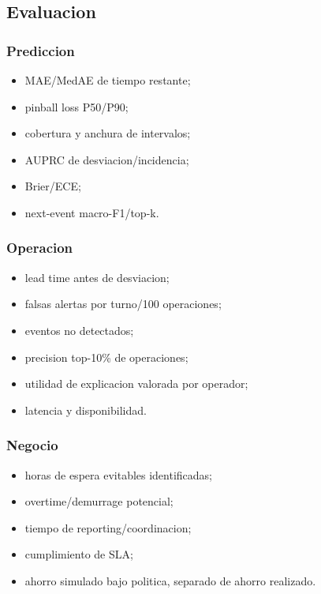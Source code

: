 \documentclass[
  spanish,
  10pt,
  a4paper,
]{article}
\providecommand{\tightlist}{%
  \setlength{\itemsep}{0pt}\setlength{\parskip}{0pt}}
\begin{document}
\subsection{Evaluacion}\label{evaluacion}

\subsubsection{Prediccion}\label{prediccion}

\begin{itemize}
\tightlist
\item
  MAE/MedAE de tiempo restante;
\item
  pinball loss P50/P90;
\item
  cobertura y anchura de intervalos;
\item
  AUPRC de desviacion/incidencia;
\item
  Brier/ECE;
\item
  next-event macro-F1/top-k.
\end{itemize}

\subsubsection{Operacion}\label{operacion}

\begin{itemize}
\tightlist
\item
  lead time antes de desviacion;
\item
  falsas alertas por turno/100 operaciones;
\item
  eventos no detectados;
\item
  precision top-10\% de operaciones;
\item
  utilidad de explicacion valorada por operador;
\item
  latencia y disponibilidad.
\end{itemize}

\subsubsection{Negocio}\label{negocio}

\begin{itemize}
\tightlist
\item
  horas de espera evitables identificadas;
\item
  overtime/demurrage potencial;
\item
  tiempo de reporting/coordinacion;
\item
  cumplimiento de SLA;
\item
  ahorro simulado bajo politica, separado de ahorro realizado.
\end{itemize}
\end{document}
